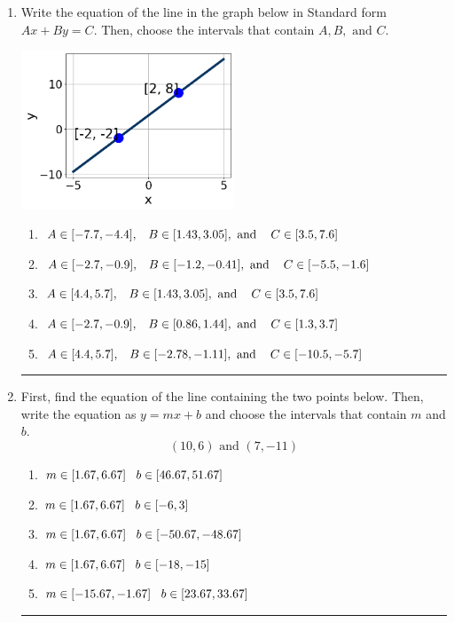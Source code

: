 \documentclass[14pt]{extbook}
\newcommand{\litem}[1]{\item#1\hspace*{-1cm}\rule{\textwidth}{0.4pt}}
\begin{document}
\begin{enumerate}
{\begin{enumerate}[label=\Alph*.]
\end{enumerate} }
\litem{
Write the equation of the line in the graph below in Standard form $Ax+By=C$. Then, choose the intervals that contain $A, B, \text{ and } C$.
\begin{center}
    \includegraphics[width=0.5\textwidth]{../Figures/linearGraphToStandardCopyC.png}
\end{center}
\begin{enumerate}[label=\Alph*.]
\item \( A \in [-7.7, -4.4], \hspace{3mm} B \in [1.43, 3.05], \text{ and } \hspace{3mm} C \in [3.5, 7.6] \)
\item \( A \in [-2.7, -0.9], \hspace{3mm} B \in [-1.2, -0.41], \text{ and } \hspace{3mm} C \in [-5.5, -1.6] \)
\item \( A \in [4.4, 5.7], \hspace{3mm} B \in [1.43, 3.05], \text{ and } \hspace{3mm} C \in [3.5, 7.6] \)
\item \( A \in [-2.7, -0.9], \hspace{3mm} B \in [0.86, 1.44], \text{ and } \hspace{3mm} C \in [1.3, 3.7] \)
\item \( A \in [4.4, 5.7], \hspace{3mm} B \in [-2.78, -1.11], \text{ and } \hspace{3mm} C \in [-10.5, -5.7] \)

\end{enumerate} }
\litem{
First, find the equation of the line containing the two points below. Then, write the equation as $ y=mx+b $ and choose the intervals that contain $m$ and $b$.\[ (10, 6) \text{ and } (7, -11) \]\begin{enumerate}[label=\Alph*.]
\item \( m \in [1.67, 6.67] \hspace*{3mm} b \in [46.67, 51.67] \)
\item \( m \in [1.67, 6.67] \hspace*{3mm} b \in [-6, 3] \)
\item \( m \in [1.67, 6.67] \hspace*{3mm} b \in [-50.67, -48.67] \)
\item \( m \in [1.67, 6.67] \hspace*{3mm} b \in [-18, -15] \)
\item \( m \in [-15.67, -1.67] \hspace*{3mm} b \in [23.67, 33.67] \)


\end{enumerate}}
\end{enumerate}
\end{document}
